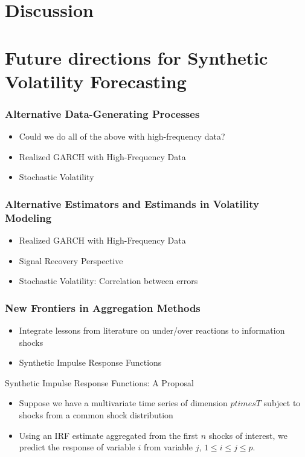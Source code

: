 \documentclass{beamer}
\theoremstyle{definition}
\begin{document}
\section{Discussion}

\section{Future directions for Synthetic Volatility Forecasting}

\begin{frame}
\frametitle{Alternative Data-Generating Processes}
\begin{itemize}

\item{Could we do all of the above with high-frequency data?}

\item{Realized GARCH with High-Frequency Data}

\item{Stochastic Volatility}
\end{itemize}
\end{frame}

\begin{frame}
    \frametitle{Alternative Estimators and Estimands in Volatility Modeling}
    \begin{itemize}
        \item{Realized GARCH with High-Frequency Data}
        
        \item{Signal Recovery Perspective}
        
        \item{Stochastic Volatility: Correlation between errors}
        
        \end{itemize}
\end{frame}
   
\begin{frame}
    \frametitle{New Frontiers in Aggregation Methods}
    \begin{itemize}
        \item Integrate lessons from literature on under/over reactions to information shocks \parencite[][]{jiang2017information}
        \item{Synthetic Impulse Response Functions}
        \end{itemize}
\end{frame}

\begin{frame}{Synthetic Impulse Response Functions: A Proposal}
    \begin{itemize}
        \item Suppose we have a multivariate time series of dimension $p times T$ subject to shocks from a common shock distribution
        \item Using an IRF estimate aggregated from the first $n$ shocks of interest, we predict the response of variable $i$ from variable $j$, $1\leq i \leq j \leq p$. 
    \end{itemize}
    
\end{frame}
\end{document}
